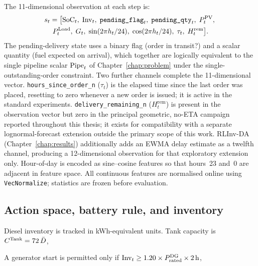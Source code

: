The 11-dimensional observation at each step is:
\begin{multline}
s_t = \bigl[
  \mathrm{SoC}_t,\;
  \mathrm{Inv}_t,\;
  \texttt{pending\_flag}_t,\;
  \texttt{pending\_qty}_t,\;
  P_t^{\mathrm{PV}},\; \\
  P_t^{\mathrm{Load}},\;
  G_t,\;
  \sin(2\pi h_t/24),\;
  \cos(2\pi h_t/24),\;
  \tau_t,\;
  H_t^{\mathrm{rem}}
\bigr].
\end{multline}
The pending-delivery state uses a binary flag (order in transit?) and a
scalar quantity (fuel expected on arrival), which together are logically
equivalent to the single pipeline scalar $\mathrm{Pipe}_t$ of
Chapter~\ref{chap:problem} under the single-outstanding-order constraint.
Two further channels complete the 11-dimensional vector. \texttt{hours\_since\_order\_n}
($\tau_t$) is the elapsed time since the last order was placed,
resetting to zero whenever a new order is issued; it is active in the
standard experiments. \texttt{delivery\_remaining\_n} ($H_t^{\mathrm{rem}}$) is present
in the observation vector but zero in the principal geometric,
no-ETA campaign reported throughout this thesis; it exists for
compatibility with a separate lognormal-forecast extension outside the
primary scope of this work. RLInv-DA (Chapter~\ref{chap:results})
additionally adds an EWMA delay estimate as a twelfth channel, producing
a 12-dimensional observation for that exploratory extension only.
Hour-of-day is encoded as sine--cosine features so that hours~23 and~0 are
adjacent in feature space.  All continuous features are normalised online using
\texttt{VecNormalize}; statistics are frozen before evaluation.

\subsection{Action space, battery rule, and inventory}

Diesel inventory is tracked in kWh-equivalent units. Tank capacity is
$C^{\mathrm{Tank}} = 72\,\bar{D}$, 

A generator start is permitted only if
$\mathrm{Inv}_t \geq 1.20 \times P_{\mathrm{rated}}^{\mathrm{DG}} \times 2\,\mathrm{h}$,

